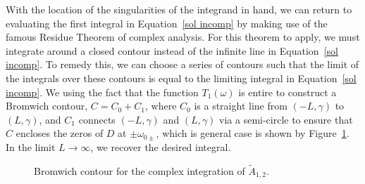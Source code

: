 \documentclass{aastex61}
\begin{document}
With the location of the singularities of the integrand in hand, we can return to evaluating the first integral in Equation~\eqref{sol incomp} by making use of the famous Residue Theorem of complex analysis. For this theorem to apply, we must integrate around a closed contour instead of the infinite line in Equation~\eqref{sol incomp}. To remedy this, we can choose a series of contours such that the limit of the integrals over these contours is equal to the limiting integral in Equation~\eqref{sol incomp}. We using the fact that the function $T_1(\omega)$ is entire to construct a Bromwich contour, $C = C_0 + C_1$, where $C_0$ is a straight line from $(-L, \gamma)$ to $(L, \gamma)$, and $C_1$ connects $(-L, \gamma)$ and $(L, \gamma)$ via a semi-circle to ensure that $C$ encloses the zeros of $D$ at $\pm\omega_{0\pm}$, which is general case is shown by Figure~\ref{fig: brom cont incomp}. In the limit $L \to \infty$, we recover the desired integral.

\begin{figure}
	\centering
	\caption{Bromwich contour for the complex integration of $\tilde{A}_{1,2}$.}
	\label{fig: brom cont incomp}
\end{figure}
\end{document}
